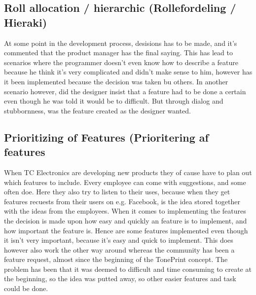 \subsection*{Roll allocation / hierarchic (Rollefordeling / Hieraki)}
\label{ThemeRollAllocation}
At some point in the development process, desisions has to be made, and it's commented that the product manager has the final saying. This has lead to scenarios where the programmer doesn't even know how to describe a feature because he think it's very complicated and didn't make sense to him, however has it been implemented because the decision was taken bu others. In another scenario however, did the designer insist that a feature had to be done a certain even though he was told it would be to difficult. But through dialog and stubbornness, was the feature created as the designer wanted.

\subsection*{Prioritizing of Features (Prioritering af features}
\label{ThemePrioritizingOfFeatures}
When TC Electronics are developing new products they of cause have to plan out which features to include. Every employee can come with suggestions, and some often doe. Here they also try to listen to their uses, because when they get features recuests from their users on e.g. Facebook, is the idea stored together with the ideas from the employees. When it comes to implementing the features the decision is made upon how easy and quickly an feature is to implement, and how important the feature is. Hence are some features implemented even though it isn't very important, because it's easy and quick to implement. This does however also work the other way around whereas the community has been a feature request, almost since the beginning of the TonePrint concept. The problem has been that it was deemed to difficult and time consuming to create at the beginning, so the idea was putted away, so other easier features and task could be done.

